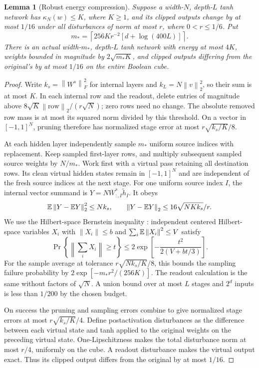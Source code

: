 \documentclass[11pt]{article}
\newtheorem{lemma}[theorem]{Lemma}
\theoremstyle{remark}\newtheorem{remark}[theorem]{Remark}
\newcommand{\norm}[1]{\left\lVert#1\right\rVert}
\begin{document}
\begin{lemma}[Robust energy compression]\label{lem:compression}
Suppose a width-$N$, depth-$L$ tanh network has $\kappa_N(w)\le K$,
where $K\ge1$, and its clipped outputs change by at most $1/16$ under
all disturbances of norm at most $r$, where $0<r\le1/6$. Put
\[
 m_*=\left\lceil256Kr^{-2}[d+\log(400L)]\right\rceil.
\]
There is an actual width-$m_*$, depth-$L$ tanh network with energy at
most $4K$, weights bounded in magnitude by $2\sqrt{m_*K}$, and
clipped outputs differing from the original's by at most $1/16$ on the
entire Boolean cube.
\end{lemma}
\begin{proof}
Write $k_s=\norm{W^s}_F^2$ for internal layers and
$k_L=N\norm v_2^2$, so their sum is at most $K$.
In each internal row and the readout, delete entries of magnitude above
$8\sqrt K\norm{\text{row}}_2/(r\sqrt N)$; zero rows need no change.
The absolute removed row mass is at most its squared norm divided by
this threshold. On a vector in $[-1,1]^N$, pruning therefore has
normalized stage error at most $r\sqrt{k_s/K}/8$.

At each hidden layer independently sample $m_*$ uniform source indices
with replacement. Keep sampled first-layer rows, and multiply subsequent
sampled source weights by $N/m_*$. Work first with a virtual pass retaining
all destination rows. Its clean virtual hidden states remain in
$[-1,1]^N$ and are independent of the fresh source indices at the next
stage. For one uniform source index $I$, the internal vector summand is
$Y=N\overline W^s_{:,I}\widetilde h_I$. It obeys
\[
 \E\norm{Y-\E Y}_2^2\le Nk_s,\qquad
 \norm{Y-\E Y}_2\le16\sqrt{NKk_s}/r.
\]
We use the Hilbert-space Bernstein inequality
\cite[Appendix A, Corollary A.2]{tarres-yao}: independent centered
Hilbert-space variables $X_i$ with $\norm{X_i}\le b$ and
$\sum_i\E\norm{X_i}^2\le V$ satisfy
\[
 \Pr\!\left\{\left\|\sum_iX_i\right\|\ge t\right\}
 \le2\exp\!\left[-\frac{t^2}{2(V+bt/3)}\right].
\]
For the sample average at tolerance
$r\sqrt{Nk_s/K}/8$, this bounds the sampling failure probability by
$2\exp[-m_*r^2/(256K)]$. The readout calculation is the same without
factors of $\sqrt N$. A union bound over at most $L$ stages and $2^d$
inputs is less than $1/200$ by the chosen budget.

On success the pruning and sampling errors combine to give normalized
stage errors at most $r\sqrt{k_s/K}/4$. Define postactivation disturbances
as the difference between each virtual state and tanh applied to the
original weights on the preceding virtual state. One-Lipschitzness makes
the total disturbance norm at most $r/4$, uniformly on the cube. A
readout disturbance makes the virtual output exact. Thus its clipped
output differs from the original by at most $1/16$.


\end{proof}
\end{document}
